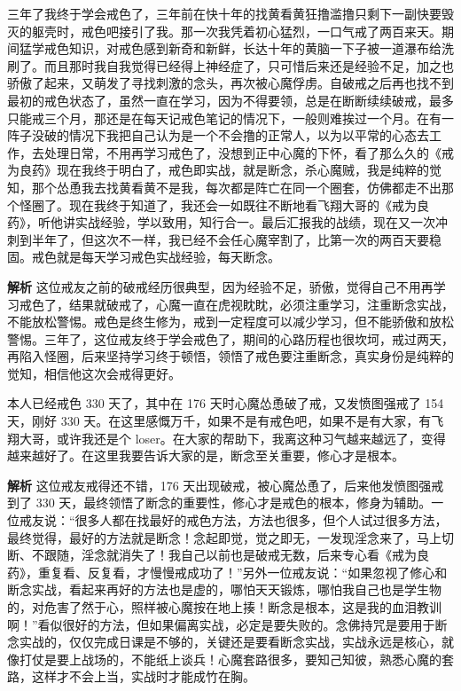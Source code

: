 \begin{case}[各种断念方式的比较]
    三年了我终于学会戒色了，三年前在快十年的找黄看黄狂撸滥撸只剩下一副快要毁灭的躯壳时，戒色吧接引了我。那一次我凭着初心猛烈，一口气戒了两百来天。期间猛学戒色知识，对戒色感到新奇和新鲜，长达十年的黄脑一下子被一道瀑布给洗刷了。而且那时我自我觉得已经得上神经症了，只可惜后来还是经验不足，加之也骄傲了起来，又萌发了寻找刺激的念头，再次被心魔俘虏。自破戒之后再也找不到最初的戒色状态了，虽然一直在学习，因为不得要领，总是在断断续续破戒，最多只能戒三个月，那还是在每天记戒色笔记的情况下，一般则难挨过一个月。在有一阵子没破的情况下我把自己认为是一个不会撸的正常人，以为以平常的心态去工作，去处理日常，不用再学习戒色了，没想到正中心魔的下怀，看了那么久的《戒为良药》现在我终于明白了，戒色即实战，就是断念，杀心魔贼，我是纯粹的觉知，那个怂恿我去找黄看黄不是我，每次都是阵亡在同一个圈套，仿佛都走不出那个怪圈了。现在我终于知道了，我还会一如既往不断地看飞翔大哥的《戒为良药》，听他讲实战经验，学以致用，知行合一。最后汇报我的战绩，现在又一次冲刺到半年了，但这次不一样，我已经不会任心魔宰割了，比第一次的两百天要稳固。戒色就是每天学习戒色实战经验，每天断念。

    \textbf{解析} 这位戒友之前的破戒经历很典型，因为经验不足，骄傲，觉得自己不用再学习戒色了，结果就破戒了，心魔一直在虎视眈眈，必须注重学习，注重断念实战，不能放松警惕。戒色是终生修为，戒到一定程度可以减少学习，但不能骄傲和放松警惕。三年了，这位戒友终于学会戒色了，期间的心路历程也很坎坷，戒过两天，再陷入怪圈，后来坚持学习终于顿悟，领悟了戒色要注重断念，真实身份是纯粹的觉知，相信他这次会戒得更好。
\end{case}

\begin{case}[各种断念方式的比较]
    本人已经戒色 330 天了，其中在 176 天时心魔怂恿破了戒，又发愤图强戒了 154 天，刚好 330 天。在这里感慨万千，如果不是有戒色吧，如果不是有大家，有飞翔大哥，或许我还是个 loser。在大家的帮助下，我离这种习气越来越远了，变得越来越好了。在这里我要告诉大家的是，断念至关重要，修心才是根本。

    \textbf{解析} 这位戒友戒得还不错，176 天出现破戒，被心魔怂恿了，后来他发愤图强戒到了 330 天，最终领悟了断念的重要性，修心才是戒色的根本，修身为辅助。一位戒友说：“很多人都在找最好的戒色方法，方法也很多，但个人试过很多方法，最终觉得，最好的方法就是断念！念起即觉，觉之即无，一发现淫念来了，马上切断、不跟随，淫念就消失了！我自己以前也是破戒无数，后来专心看《戒为良药》，重复看、反复看，才慢慢戒成功了！”另外一位戒友说：“如果忽视了修心和断念实战，看起来再好的方法也是虚的，哪怕天天锻炼，哪怕我自己也是学生物的，对危害了然于心，照样被心魔按在地上揍！断念是根本，这是我的血泪教训啊！”看似很好的方法，但如果偏离实战，必定是要失败的。念佛持咒是要用于断念实战的，仅仅完成日课是不够的，关键还是要看断念实战，实战永远是核心，就像打仗是要上战场的，不能纸上谈兵！心魔套路很多，要知己知彼，熟悉心魔的套路，这样才不会上当，实战时才能成竹在胸。
\end{case}

